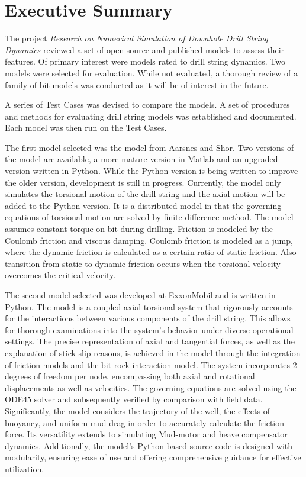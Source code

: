 \chapter*{Executive Summary}

The project \emph{Research on Numerical Simulation of Downhole Drill String Dynamics} reviewed a set of open-source and published models to assess their features.  Of primary interest were models rated to drill string dynamics.  Two models were selected for evaluation.  While not evaluated, a thorough review of a family of bit models was conducted as it will be of interest in the future.

A series of Test Cases was devised to compare the models.  A set of procedures and methods for evaluating drill string models was established and documented.  Each model was then run on the Test Cases.

The first model selected was the model from Aarsnes and Shor. Two versions of the model are available, a more mature version in Matlab and an upgraded version written in Python. While the Python version is being written to improve the older version, development is still in progress. Currently, the model only simulates the torsional motion of the drill string and the axial motion will be added to the Python version. It is a distributed model in that the governing equations of torsional motion are solved by finite difference method. The model assumes constant torque on bit during drilling. Friction is modeled by the Coulomb friction and viscous damping. Coulomb friction is modeled as a jump, where the dynamic friction is calculated as a certain ratio of static friction. Also transition from static to dynamic friction occurs when the torsional velocity overcomes the critical velocity. 

The second model selected was developed at ExxonMobil and is written in Python. The model is a coupled axial-torsional system that rigorously accounts for the interactions between various components of the drill string. This allows for thorough examinations into the system's behavior under diverse operational settings. The precise representation of axial and tangential forces, as well as the explanation of stick-slip reasons, is achieved in the model through the integration of friction models and the bit-rock interaction model. The system incorporates 2 degrees of freedom per node, encompassing both axial and rotational displacements as well as velocities. The governing equations are solved using the ODE45 solver and subsequently verified by comparison with field data. Significantly, the model considers the trajectory of the well, the effects of buoyancy, and uniform mud drag in order to accurately calculate the friction force. Its versatility extends to simulating Mud-motor and heave compensator dynamics. Additionally, the model's Python-based source code is designed with modularity, ensuring ease of use and offering comprehensive guidance for effective utilization. 

